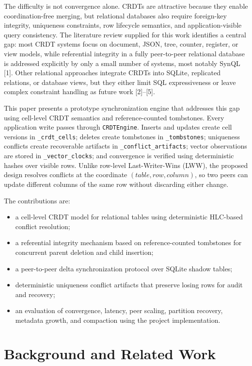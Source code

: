 \documentclass[pdflatex,sn-mathphys-num]{sn-jnl}
\begin{document}
The difficulty is not convergence alone. CRDTs are attractive because they enable coordination-free merging, but relational databases also require foreign-key integrity, uniqueness constraints, row lifecycle semantics, and application-visible query consistency. The literature review supplied for this work identifies a central gap: most CRDT systems focus on document, JSON, tree, counter, register, or view models, while referential integrity in a fully peer-to-peer relational database is addressed explicitly by only a small number of systems, most notably SynQL [1]. Other relational approaches integrate CRDTs into SQLite, replicated relations, or database views, but they either limit SQL expressiveness or leave complex constraint handling as future work [2]--[5].

This paper presents a prototype synchronization engine that addresses this gap using cell-level CRDT semantics and reference-counted tombstones. Every application write passes through \texttt{CRDTEngine}. Inserts and updates create cell versions in \texttt{\_crdt\_cells}; deletes create tombstones in \texttt{\_tombstones}; uniqueness conflicts create recoverable artifacts in \texttt{\_conflict\_artifacts}; vector observations are stored in \texttt{\_vector\_clocks}; and convergence is verified using deterministic hashes over visible rows. Unlike row-level Last-Writer-Wins (LWW), the proposed design resolves conflicts at the coordinate $(table,row,column)$, so two peers can update different columns of the same row without discarding either change.

The contributions are:
\begin{itemize}
\item a cell-level CRDT model for relational tables using deterministic HLC-based conflict resolution;
\item a referential integrity mechanism based on reference-counted tombstones for concurrent parent deletion and child insertion;
\item a peer-to-peer delta synchronization protocol over SQLite shadow tables;
\item deterministic uniqueness conflict artifacts that preserve losing rows for audit and recovery;
\item an evaluation of convergence, latency, peer scaling, partition recovery, metadata growth, and compaction using the project implementation.
\end{itemize}

\section{Background and Related Work}
\end{document}
